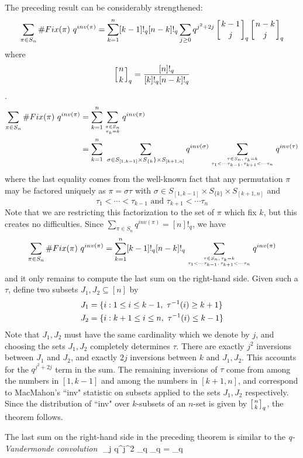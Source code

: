 The preceding result can be considerably strengthened:
$$\sum_{\pi \in S_n} \#Fix(\pi) \,\, q^{inv(\pi)}=
\sum_{k=1}^{n}[k-1]!_q [n-k]!_q 
\sum_{j \geq 0} q^{j^2+2j}
\left[ k-1 \atop j \right]_q
\left[ n-k \atop j \right]_q
$$
where 
$$\left[ n \atop k \right]_q = {[n]!_q \over [k]!_q [n-k]!_q}$$.
\endproclaim
{}
$$
\aligned
\sum_{\pi \in S_n} \#Fix(\pi) \,\, q^{inv(\pi)}
 &= \sum_{k=1}^{n} \sum_{\pi \in S_n \atop \pi_k = k}  q^{inv(\pi)} \\
 &= \sum_{k=1}^{n} \,\, \sum_{\sigma \in 
        S_{[1,k-1]} \times S_{\{k}\} \times S_{[k+1,n]}} q^{inv(\sigma)} 
          \sum_{\tau \in S_n, \, \tau_k=k \atop
            \tau_1 < \cdots \tau_{k-1}, \, \tau_{k+1} < \cdots \tau_{n}}
          q^{inv(\tau)}
\endaligned
$$
where the last equality comes from the well-known fact that any
permutation $\pi$ may be factored uniquely as $\pi = \sigma \tau$
with $\sigma \in  S_{[1,k-1]} \times S_{\{k\}} \times S_{[k+1,n]}$
and 
$$\tau_1 < \cdots < \tau_{k-1} \text{ and }\tau_{k+1} < \cdots \tau_{n}$$
Note that we are restricting this factorization to the set of
$\pi$ which fix $k$, but this creates no difficulties.  
Since $\sum_{\pi \in S_n} q^{inv(\pi)} = [n]!_q$, we have
$$
\sum_{\pi \in S_n} \#Fix(\pi) \,\, q^{inv(\pi)}
 = \sum_{k=1}^{n} [k-1]!_q [n-k]!_q 
          \sum_{\tau \in S_n, \, \tau_k=k \atop
            \tau_1 < \cdots \tau_{k-1}, \, \tau_{k+1} < \cdots \tau_{n}}
          q^{inv(\pi)}
$$
and it only remains to compute the last sum on the right-hand side.
Given such a $\tau$, define two subsets $J_1, J_2 \subseteq [n]$ by
$$
\aligned
J_1 &= \{i: 1 \leq i \leq k-1, \,\, \tau^{-1}(i) \geq k+1 \}\\
J_2 &= \{i: k+1 \leq i \leq n, \,\,\tau^{-1}(i) \leq k-1 \}
\endaligned
$$
Note that $J_1, J_2$ must have the same cardinality which we denote
by $j$, and choosing the sets $J_1, J_2$ completely determines
$\tau$. There are exactly $j^2$ inversions between $J_1$ and $J_2$,
and exactly $2j$ inversions between $k$ and $J_1,J_2$.  This accounts
for the $q^{j^2+2j}$ term in the sum.  The remaining inversions of
$\tau$ come from among the numbers in $[1,k-1]$ and among the numbers
in $[k+1,n]$, and correspond to MacMahon's ``inv" statistic
on subsets \cite{Ma} applied to the sets $J_1,J_2$ respectively.
Since the distribution of ``inv" over $k$-subsets of an $n$-set is
given by $\left[ n \atop k \right]_q$, the theorem follows.
\endproof

The last sum on the right-hand side in the preceding theorem
is similar to the {\it q-Vandermonde convolution}
$$
\sum_{j } q^{j^2}
_q
_q = _q

